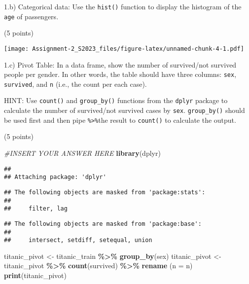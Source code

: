 \documentclass[
]{article}
\newenvironment{Shaded}{\begin{snugshade}}{\end{snugshade}}
\newcommand{\AttributeTok}[1]{\textcolor[rgb]{0.13,0.29,0.53}{#1}}
\newcommand{\CommentTok}[1]{\textcolor[rgb]{0.56,0.35,0.01}{\textit{#1}}}
\newcommand{\FunctionTok}[1]{\textcolor[rgb]{0.13,0.29,0.53}{\textbf{#1}}}
\newcommand{\NormalTok}[1]{#1}
\newcommand{\OtherTok}[1]{\textcolor[rgb]{0.56,0.35,0.01}{#1}}
\newcommand{\SpecialCharTok}[1]{\textcolor[rgb]{0.81,0.36,0.00}{\textbf{#1}}}
\newcommand{\StringTok}[1]{\textcolor[rgb]{0.31,0.60,0.02}{#1}}
\begin{document}
1.b) Categorical data: Use the \texttt{hist()} function to display the
histogram of the \texttt{age} of passengers.

(5 points)

\begin{Shaded}
\end{Shaded}

\texttt{[image: Assignment-2\_S2023\_files/figure-latex/unnamed-chunk-4-1.pdf]}

1.c) Pivot Table: In a data frame, show the number of survived/not
survived people per gender. In other words, the table should have three
columns: \texttt{sex}, \texttt{survived}, and \texttt{n} (i.e., the
count per each case).

HINT: Use \texttt{count()} and \texttt{group\_by()} functions from the
\texttt{dplyr} package to calculate the number of survived/not survived
cases by \texttt{sex}. \texttt{group\_by()} should be used first and
then pipe \texttt{\%\textgreater{}\%}the result to \texttt{count()} to
calculate the output.

(5 points)

\begin{Shaded}
\begin{Highlighting}[]
\CommentTok{\#INSERT YOUR ANSWER HERE}
\FunctionTok{library}\NormalTok{(dplyr)}
\end{Highlighting}
\end{Shaded}

\begin{verbatim}
## 
## Attaching package: 'dplyr'
\end{verbatim}

\begin{verbatim}
## The following objects are masked from 'package:stats':
## 
##     filter, lag
\end{verbatim}

\begin{verbatim}
## The following objects are masked from 'package:base':
## 
##     intersect, setdiff, setequal, union
\end{verbatim}

\begin{Shaded}
\begin{Highlighting}[]
\NormalTok{titanic\_pivot }\OtherTok{\textless{}{-}}\NormalTok{ titanic\_train }\SpecialCharTok{\%\textgreater{}\%} \FunctionTok{group\_by}\NormalTok{(sex)}
\NormalTok{titanic\_pivot }\OtherTok{\textless{}{-}}\NormalTok{ titanic\_pivot }\SpecialCharTok{\%\textgreater{}\%} \FunctionTok{count}\NormalTok{(survived) }\SpecialCharTok{\%\textgreater{}\%} \FunctionTok{rename}\NormalTok{ (}\AttributeTok{n =}\NormalTok{ n)}
\FunctionTok{print}\NormalTok{(titanic\_pivot)}
\end{Highlighting}
\end{Shaded}
\end{document}
